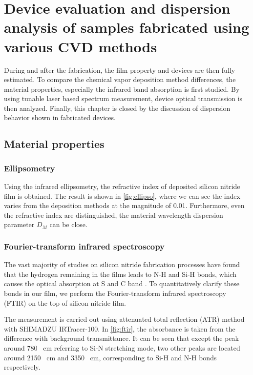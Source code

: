 
\chapter{Device evaluation and dispersion analysis of samples fabricated using various CVD methods}\label{chap:5}%
During and after the fabrication, the film property and devices are then fully estimated. To compare the chemical vapor deposition method differences, the material properties, especially the infrared band absorption is first studied. By using tunable laser based spectrum measurement, device optical transmission is then analyzed. Finally, this chapter is closed by the discussion of dispersion behavior shown in fabricated devices.

\section{Material properties}

\subsection{Ellipsometry}

Using the infrared ellipsometry, the refractive index of deposited silicon nitride film is obtained. The result is shown in \autoref{fig:ellipso}, where we can see the index varies from the deposition methods at the magnitude of 0.01. 
Furthermore, even the refractive index are distinguished, the material wavelength dispersion parameter $D_M$ can be close.

\subsection{Fourier-transform infrared spectroscopy}

The vast majority of studies on silicon nitride fabrication processes have found that the hydrogen remaining in the films leads to N-H and Si-H bonds, which causes the optical absorption at S and C band \cites{Ay2004, Agnihotri2000}. To quantitatively clarify these bonds in our film, we perform the Fourier-transform infrared spectroscopy (FTIR) on the top of silicon nitride film.

The measurement is carried out using attenuated total reflection (ATR) method with SHIMADZU IRTracer-100. In \autoref{fig:ftir}, the absorbance is taken from the difference with background transmittance. It can be seen that except the peak around 780 \si{\per\cm} referring to Si-N stretching mode, two other peaks are located around 2150 \si{\per\cm} and 3350 \si{\per\cm}, corresponding to Si-H and N-H bonds respectively.

